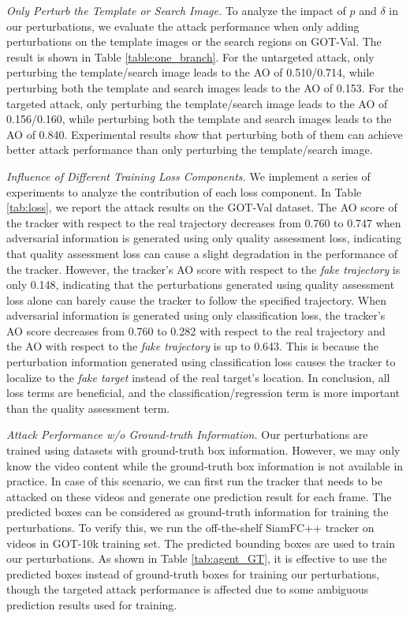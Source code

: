 \documentclass[journal]{IEEEtran}
\renewcommand{\uline}{}
\begin{document}
\textit{Only Perturb the Template or Search Image.} To analyze the impact of $p$ and $\delta$ in our perturbations, we evaluate the attack performance when only adding perturbations on the template images or the search regions on GOT-Val. The result is shown in Table \ref{table:one_branch}. For the untargeted attack, only perturbing the template/search image leads to the AO of 0.510/0.714, while perturbing both the template and search \uline{images} leads to the AO of 0.153. For the targeted attack, only perturbing the template/search image leads to the AO of 0.156/0.160, while perturbing both the template and search \uline{images} leads to the AO of 0.840. Experimental results show that perturbing both of them can achieve better attack performance than only perturbing the template/search image.

\textit{Influence of Different Training Loss Components.} We implement a series of experiments to analyze the contribution of each loss component. In Table \ref{tab:loss}, we report the attack results on the GOT-Val dataset. The AO score of the tracker with respect to the real trajectory decreases from 0.760 to 0.747 when adversarial information is generated using only quality assessment loss, indicating that quality assessment loss can cause a slight degradation in the performance of the tracker. However, the tracker's AO score with respect to the \textit{fake trajectory} is only 0.148, indicating that the perturbations generated using quality assessment loss alone can barely cause the tracker to follow the specified trajectory. When adversarial information is generated using only classification loss, the tracker's AO score decreases from 0.760 to 0.282 with respect to the real trajectory and the AO with respect to the \textit{fake trajectory} is up to 0.643. This is because the perturbation information generated using classification loss causes the tracker to localize to the \uline{\textit{fake target}} instead of the real target's location. In conclusion, all loss terms are beneficial, and the classification/regression term is more important than the quality assessment term.

\textit{Attack Performance w/o \uline{Ground-truth} Information.} Our perturbations are trained using datasets with \uline{ground-truth} box information. However, we may only know the video content while the \uline{ground-truth} box information is not available in practice. In case of this scenario, we can first run the tracker that needs to be attacked on these videos and generate one prediction result for each frame. The predicted boxes can be considered as \uline{ground-truth} information for training the perturbations. To verify this, we run the off-the-shelf SiamFC++ tracker on videos in GOT-10k training set. The predicted bounding boxes are used to train our perturbations. As shown in Table \ref{tab:agent_GT}, it is effective to use the predicted boxes instead of \uline{ground-truth} boxes for training our perturbations, though the targeted attack performance is affected due to some ambiguous prediction results used for training.
\end{document}

